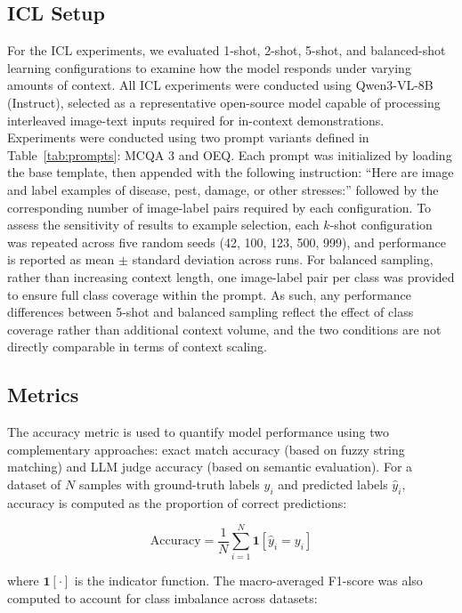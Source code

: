 \documentclass[10pt,letterpaper]{article}
\begin{document}
\subsection{ICL Setup}
\label{sec:icl_setup}
For the ICL experiments, we evaluated 1-shot, 2-shot, 5-shot, and balanced-shot learning configurations to examine how the model responds under varying amounts of context. All ICL experiments were conducted using Qwen3-VL-8B (Instruct), selected as a representative open-source model capable of processing interleaved image-text inputs required for in-context demonstrations. Experiments were conducted using two prompt variants defined in Table~\ref{tab:prompts}: MCQA 3 and OEQ. Each prompt was initialized by loading the base template, then appended with the following instruction: ``Here are image and label examples of disease, pest, damage, or other stresses:'' followed by the corresponding number of image-label pairs required by each configuration. To assess the sensitivity of results to example selection, each $k$-shot configuration was repeated across five random seeds (42, 100, 123, 500, 999), and performance is reported as mean $\pm$ standard deviation across runs. For balanced sampling, rather than increasing context length, one image-label pair per class was provided to ensure full class coverage within the prompt. As such, any performance differences between 5-shot and balanced sampling reflect the effect of class coverage rather than additional context volume, and the two conditions are not directly comparable in terms of context scaling.

\subsection{Metrics}                                    
The accuracy metric is used to quantify model performance using two complementary approaches: exact match accuracy (based on fuzzy string matching) and LLM judge accuracy (based on semantic evaluation). For a dataset of $N$ samples with ground-truth labels $y_i$ and predicted labels $\hat{y}_i$, accuracy is computed as the proportion of correct predictions:

\begin{equation}
  \text{Accuracy} = \frac{1}{N} \sum_{i=1}^{N} \mathbf{1}[\hat{y}_i = y_i]
\end{equation}

\noindent where $\mathbf{1}[\cdot]$ is the indicator function. The macro-averaged F1-score was also computed to account for class imbalance across datasets:
\end{document}
